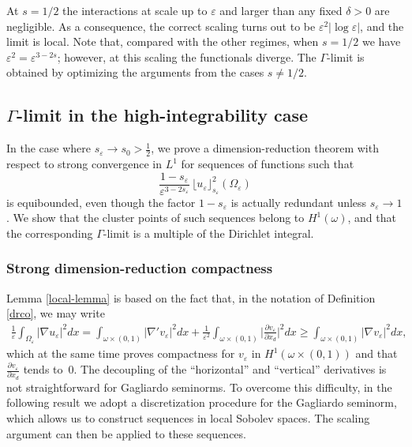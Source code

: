 \documentclass[11pt]{article}
\def\e{\varepsilon}
\begin{document}
\medskip
{} At $s=1/2$ the interactions at scale up to $\e$ and larger than any fixed $\delta>0$ are negligible. As a consequence, the correct scaling turns out to be $\e^2|\log\e|$, and the limit is local. Note that, compared with the other regimes, when $s=1/2$ we have $\e^2=\e^{3-2s}$; however, at this scaling the functionals diverge. The $\Gamma$-limit is obtained by optimizing the arguments from the cases $s\neq 1/2$.


\subsection{$\Gamma$-limit in the high-integrability case}\label{dr+12}
In the case where $s_\varepsilon \to s_0 > \tfrac12$, we prove a dimension-reduction theorem with respect to strong convergence in $L^1$ for sequences of functions such that
\[
\frac{1 - s_\varepsilon}{\varepsilon^{3 - 2s_\varepsilon}} \, \lfloor u_\varepsilon \rfloor_{s_\varepsilon}^2(\Omega_\varepsilon)
\]
is equibounded, even though the factor $1 - s_\varepsilon$ is actually redundant unless $s_\varepsilon \to 1$. 
We show that the cluster points of such sequences belong to $H^1(\omega)$, and that the corresponding $\Gamma$-limit is a multiple of the Dirichlet integral.



\subsubsection{Strong dimension-reduction compactness}


 Lemma \ref{local-lemma}
 is based on the fact that, in the notation of Definition \ref{drco},
we may write
\begin{eqnarray*}
\frac1\e\int_{\Omega_\e} |\nabla u_\e|^2dx=\int_{\omega\times(0,1)}|\nabla' v_\e|^2dx+\frac1{\e^2} \int_{\omega\times(0,1)}\Big|\frac{\partial v_\e}{\partial x_d}\Big|^2dx
\ge \int_{\omega\times(0,1)}|\nabla v_\e|^2dx,
\end{eqnarray*}
which at the same time proves compactness for $v_\e$ in $H^1(\omega\times (0,1))$ and that $\frac{\partial v_\e}{\partial x_d}$ tends to~$0$.
The decoupling of the ``horizontal'' and ``vertical'' derivatives is not straightforward for Gagliardo seminorms. 
To overcome this difficulty, in the following result we adopt a discretization procedure for the Gagliardo seminorm, which allows us to construct sequences in local Sobolev spaces. 
The scaling argument can then be applied to these sequences.
\end{document}
